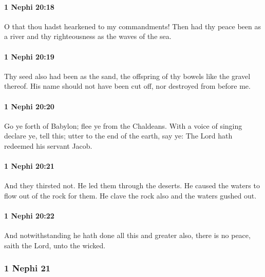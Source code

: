 		\paragraph{1 Nephi 20:18} %
			\label{1NEPHI-20-18}

			O that thou hadst hearkened to my commandments!
			Then had thy peace been as a river
			and thy righteousness as the waves of the sea.

		\paragraph{1 Nephi 20:19} %
			\label{1NEPHI-20-19}

			Thy seed also had been as the sand,
			the offspring of thy bowels like the gravel thereof.
			His name should not have been cut off,
			nor destroyed from before me.

		\paragraph{1 Nephi 20:20} %
			\label{1NEPHI-20-20}

			Go ye forth of Babylon;
			flee ye from the Chaldeans.
			With a voice of singing declare ye, tell this;
			utter to the end of the earth, say ye:
			The Lord hath redeemed his servant Jacob.

		\paragraph{1 Nephi 20:21} %
			\label{1NEPHI-20-21}

			And they thirsted not.
			He led them through the deserts.
			He caused the waters to flow out of the rock for them.
			He clave the rock also and the waters gushed out.

		\paragraph{1 Nephi 20:22} %
			\label{1NEPHI-20-22}

			And notwithstanding he hath done all this and greater also,
			there is no peace, saith the Lord, unto the wicked.

	\subsubsection{1 Nephi 21} %
		\label{1NEPHI-21}
		
